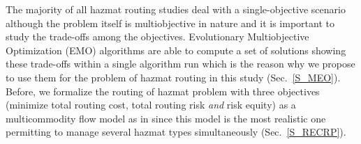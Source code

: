 \documentclass[preprint,12pt]{elsarticle}
\newcommand{\TODON}[1]{{\color{blue}TODO: #1}}
\begin{document}
The majority of all hazmat routing studies deal with a single-objective scenario although the problem itself is multiobjective in nature and it is important to study the trade-offs among the objectives. Evolutionary Multiobjective Optimization (EMO) algorithms are able to compute a set of solutions showing these trade-offs within a single algorithm run which is the reason why we propose to use them for the problem of hazmat routing in this study (Sec.~\ref{S_MEO}). Before, we formalize the routing of hazmat problem with three objectives (minimize total routing cost, total routing risk {\em and} risk equity) as a multicommodity flow model as in \cite{cd2008a} since this model is the most realistic one permitting to manage several hazmat types simultaneously (Sec.~\ref{S_RECRP}).




\end{document}
